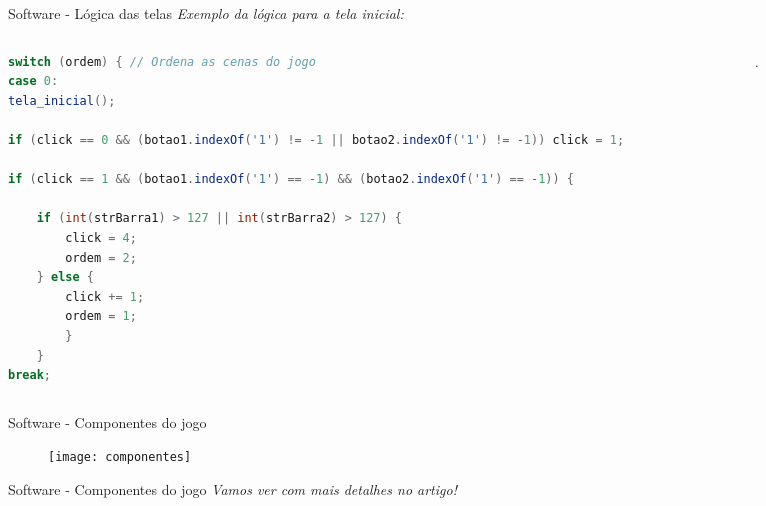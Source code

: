\begin{frame}[fragile]{Software - Lógica das telas}
\emph{Exemplo da lógica para a tela inicial:}
\vspace{0.1cm}
\centering
\begin{columns}
\begin{column}{0.4\textwidth}
\scriptsize
\begin{lstlisting}[language=java]
switch (ordem) { // Ordena as cenas do jogo
case 0:
tela_inicial();

if (click == 0 && (botao1.indexOf('1') != -1 || botao2.indexOf('1') != -1)) click = 1;
		
if (click == 1 && (botao1.indexOf('1') == -1) && (botao2.indexOf('1') == -1)) {
		
	if (int(strBarra1) > 127 || int(strBarra2) > 127) {
		click = 4;
		ordem = 2;
	} else {
		click += 1;
		ordem = 1;
		}
	}
break;
\end{lstlisting}
\end{column}
\begin{column}{0.7\textwidth}
			.	
			\end{column}
\end{columns}
\end{frame}
%
\begin{frame}[c]{Software - Componentes do jogo}
	
	\begin{figure}
		\centering
	    	\texttt{[image: componentes]}
	\end{figure}


\end{frame}
\begin{frame}[c]{Software - Componentes do jogo}
	\emph{Vamos ver com mais detalhes no artigo!}
	\href{https://github.com/Mila2k2/Desafio-03-Pong/blob/main/artigo-pong/modelo-artigo.pdf}{}


\end{frame}
